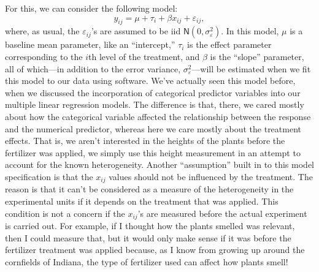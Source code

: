\documentclass[a4paper, 12pt]{article}
\theoremstyle{plain}
\theoremstyle{definition}
\theoremstyle{remark}
\newcommand{\eps}{\varepsilon}
\newcommand{\nm}{\mathsf{N}}
\begin{document}
For this, we can consider the following model:
\[ y_{ij} = \mu + \tau_i + \beta x_{ij} + \eps_{ij}, \]
where, as usual, the $\eps_{ij}$'s are assumed to be iid $\nm(0, \sigma_\eps^2)$.  In this model, $\mu$ is a baseline mean parameter, like an ``intercept,'' $\tau_i$ is the effect parameter corresponding to the $i$th level of the treatment, and $\beta$ is the ``slope'' parameter, all of which---in addition to the error variance, $\sigma_\eps^2$---will be estimated when we fit this model to our data using software.  We've actually seen this model before, when we discussed the incorporation of categorical predictor variables into our multiple linear regression models.  The difference is that, there, we cared mostly about how the categorical variable affected the relationship between the response and the numerical predictor, whereas here we care mostly about the treatment effects.  That is, we aren't interested in the heights of the plants before the fertilizer was applied, we simply use this height measurement in an attempt to account for the known heterogeneity.  Another ``assumption'' built in to this model specification is that the $x_{ij}$ values should not be influenced by the treatment.  The reason is that it can't be considered as a measure of the heterogeneity in the experimental units if it depends on the treatment that was applied.  This condition is not a concern if the $x_{ij}$'s are measured before the actual experiment is carried out.  For example, if I thought how the plants smelled was relevant, then I could measure that, but it would only make sense if it was before the fertilizer treatment was applied because, as I know from growing up around the cornfields of Indiana, the type of fertilizer used can affect how plants smell!
\end{document}

